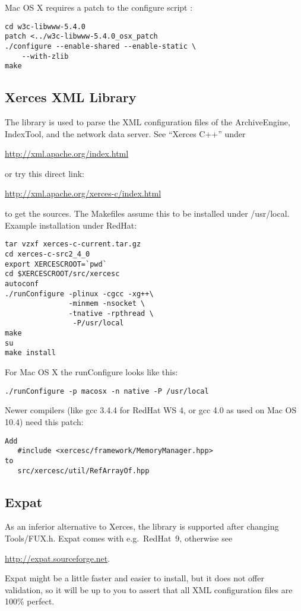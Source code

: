 \noindent Mac OS X requires a patch to the configure script \cite{darwinports}:
\begin{lstlisting}[keywordstyle=\sffamily]
cd w3c-libwww-5.4.0
patch <../w3c-libwww-5.4.0_osx_patch
./configure --enable-shared --enable-static \
    --with-zlib
make
\end{lstlisting}

\subsection{Xerces XML Library}
The  library is used to parse the XML configuration files of the
ArchiveEngine, IndexTool, and the network data server.
See ``Xerces C++'' under
\begin{center}
\href{http://xml.apache.org/index.html}{http://xml.apache.org/index.html}
\end{center}
or try this direct link:
\begin{center}
\href{http://xml.apache.org/xerces-c/index.html}
     {http://xml.apache.org/xerces-c/index.html}
\end{center}
to get the sources. The Makefiles assume this to be installed under /usr/local.
Example installation under RedHat:
\begin{lstlisting}[keywordstyle=\sffamily]
tar vzxf xerces-c-current.tar.gz 
cd xerces-c-src2_4_0
export XERCESCROOT=`pwd`
cd $XERCESCROOT/src/xercesc
autoconf
./runConfigure -plinux -cgcc -xg++\
               -minmem -nsocket \
               -tnative -rpthread \
                -P/usr/local
make
su
make install
\end{lstlisting}

\noindent For Mac OS X the runConfigure looks like this:
\begin{lstlisting}[keywordstyle=\sffamily]
./runConfigure -p macosx -n native -P /usr/local
\end{lstlisting}

\noindent Newer compilers (like gcc 3.4.4 for RedHat WS 4,
 or gcc 4.0 as used on Mac OS 10.4)
need this patch:
\begin{lstlisting}[keywordstyle=\sffamily]
Add
   #include <xercesc/framework/MemoryManager.hpp>
to
   src/xercesc/util/RefArrayOf.hpp
\end{lstlisting}


\subsection{Expat}
As an inferior alternative to Xerces, the  library is supported
after changing Tools/FUX.h. Expat comes with e.g.\ RedHat~9,
otherwise see
\begin{center}
\href{http://expat.sourceforge.net}{http://expat.sourceforge.net}.
\end{center}
Expat might be a little faster and easier to install, but it does not
offer validation, so it will be up to you to assert that all XML
configuration files are 100\% perfect.

